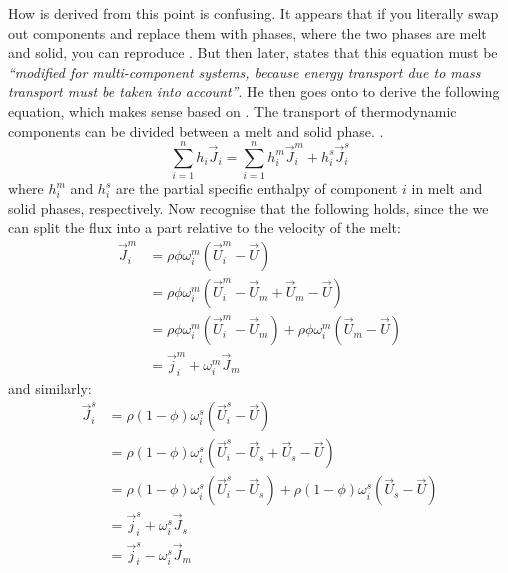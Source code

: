 How \cite[Eq.~4][]{ABE95} is derived from this point is confusing.  It appears that if you literally swap out components and replace them with phases, where the two phases are melt and solid, you can reproduce \cite[Eq.~4][]{ABE95}.  But then later, \cite{ABE95} states that this equation must be \emph{``modified for multi-component systems, because energy transport due to mass transport must be taken into account''}.  He then goes onto to derive the following equation, which makes sense based on \cite[Eq.~A10,][]{ABE95}.  The transport of thermodynamic components can be divided between a melt and solid phase.  .
\begin{equation}
\sum_{i=1}^n h_i\vec{J}_i = \sum_{i=1}^n h_i^m \vec{J}_i^m + h_i^s \vec{J}_i^s
\end{equation}
where $h_i^m$ and $h_i^s$ are the partial specific enthalpy of component $i$ in melt and solid phases, respectively.  Now recognise that the following holds, since the we can split the flux into a part relative to the velocity of the melt:
\begin{subequations}
\begin{align}
\vec{J}_i^m&= \rho \phi \omega_i^m (\vec{U}_i^m - \vec{U} )\\
&= \rho \phi \omega_i^m (\vec{U}_i^m - \vec{U}_{m} + \vec{U}_m - \vec{U} )\\
&= \rho \phi \omega_i^m (\vec{U}_i^m - \vec{U}_{m} ) + \rho \phi \omega_i^m ( \vec{U}_m - \vec{U} )\\
&= \vec{j}_i^m + \omega_i^m \vec{J}_m
\end{align}
\label{eq:J_mi}
\end{subequations}
and similarly:
\begin{subequations}
\begin{align}
\vec{J}_i^s&= \rho (1-\phi) \omega_i^s (\vec{U}_i^s - \vec{U} )\\
&= \rho (1-\phi) \omega_i^s (\vec{U}_i^s - \vec{U}_s + \vec{U}_s - \vec{U} )\\
&= \rho (1-\phi) \omega_i^s (\vec{U}_i^s - \vec{U}_s) + \rho (1-\phi) \omega_i^s (\vec{U}_{s} - \vec{U})\\
&= \vec{j}_i^s + \omega_i^s \vec{J}_s\\
&= \vec{j}_i^s - \omega_i^s \vec{J}_m
\end{align}
\label{eq:J_si}
\end{subequations}
